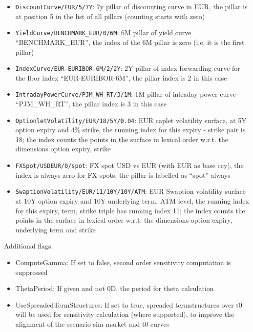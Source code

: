 \begin{itemize}
\item {\tt DiscountCurve/EUR/5/7Y}: 7y pillar of discounting curve in EUR, the pillar is at position 5 in the list of
  all pillars (counting starts with zero)
\item {\tt YieldCurve/BENCHMARK\_EUR/0/6M}: 6M pillar of yield curve ``BENCHMARK\_EUR'', the index of the 6M pillar is
  zero (i.e. it is the first pillar)
\item {\tt IndexCurve/EUR-EURIBOR-6M/2/2Y}: 2Y pillar of index forwarding curve for the Ibor index ``EUR-EURIBOR-6M'',
  the pillar index is 2 in this case
\item {\tt IntradayPowerCurve/PJM\_WH\_RT/3/1M}: 1M pillar of intraday power curve ``PJM\_WH\_RT'',
  the pillar index is 3 in this case
\item {\tt OptionletVolatility/EUR/18/5Y/0.04}: EUR caplet volatility surface, at 5Y option expiry and $4\%$ strike, the
  running index for this expiry - strike pair is 18; the index counts the points in the surface in lexical order
  w.r.t. the dimensions option expiry, strike
\item {\tt FXSpot/USDEUR/0/spot}: FX spot USD vs EUR (with EUR as base ccy), the index is always zero for FX spots, the
  pillar is labelled as ``spot'' always
\item {\tt SwaptionVolatility/EUR/11/10Y/10Y/ATM}: EUR Swaption volatility surface at 10Y option expiry and 10Y
  underlying term, ATM level, the running index for this expiry, term, strike triple has running index 11; the index
  counts the points in the surface in lexical order w.r.t. the dimensions option expiry, underlying term and strike
\end{itemize}

Additional flags:

\begin{itemize}
\item ComputeGamma: If set to false, second order sensitivity computation is suppressed
\item ThetaPeriod: If given and not 0D, the period for theta calculation
\item UseSpreadedTermStructures: If set to true, spreaded termstructures over t0 will be used for sensitivity
  calculation (where supported), to improve the alignment of the scenario sim market and t0 curves
\end{itemize}

